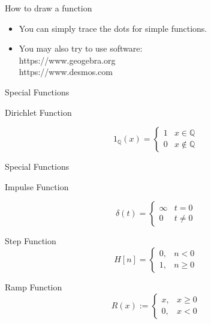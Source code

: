 \begin{frame}{How to draw a function}
    \begin{itemize}
        \item You can simply trace the dots for simple functions.
        \item You may also try to use software:\\
              https://www.geogebra.org\\
              https://www.desmos.com
    \end{itemize}
\end{frame}
\begin{frame}{Special Functions}
    \begin{block}{Dirichlet Function}

        $$
            1_{\mathbb{Q}}(x)= \begin{cases}1 & x \in \mathbb{Q} \\ 0 & x \notin \mathbb{Q}\end{cases}
        $$
    \end{block}
\end{frame}

\begin{frame}{Special Functions}
    \begin{block}{Impulse Function}

        $$
            \delta(t)= \begin{cases}\infty & t=0 \\ 0 & t \neq 0\end{cases}
        $$
    \end{block}
    \begin{block}{Step Function}
        $$
            H[n]= \begin{cases}0, & n<0 \\ 1, & n \geq 0\end{cases}
        $$
    \end{block}
    \begin{block}{Ramp Function}
        $$
            R(x):= \begin{cases}x, & x \geq 0 \\ 0, & x<0\end{cases}
        $$
    \end{block}
\end{frame}

